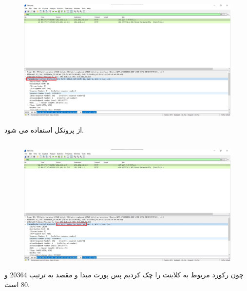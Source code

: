 \documentclass{article}
\begin{document}
\subsection{}
\begin{figure}[H]
    \centering
    \includegraphics[width=1.0\textwidth]{figures/43.jpg}
    \caption{}
    \label{fig:fig1}
\end{figure}
از پروتکل  استفاده می ‌شود.
\subsection{}
\begin{figure}[H]
    \centering
    \includegraphics[width=1.0\textwidth]{figures/44.jpg}
    \caption{}
    \label{fig:fig1}
\end{figure}
چون رکورد مربوط به کلاینت را چک کردیم پس پورت مبدا و مقصد به ترتیب 20364 و 80 است.
\end{document}
